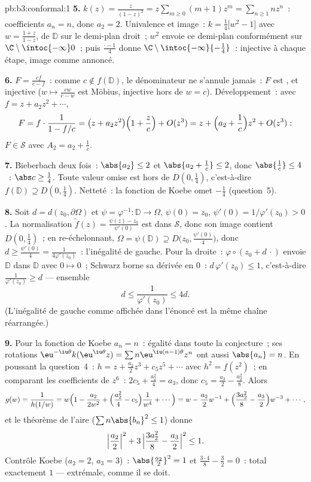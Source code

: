 \begin{solution}{pb:b3:conformal:1}
\textbf{5.} $k(z) = \frac z{(1-z)^2} = z\sum_{m\geq0}(m +
1)z^m = \sum_{n\geq1}nz^n$~: coefficients $a_n = n$, donc
$a_2 = 2$. Univalence et image~: $k = \frac14\bigl[w^2 -
1\bigr]$ avec $w = \frac{1 + z}{1 - z}$,  de $\mathbb D$ sur le demi-plan droit~; $w^2$
envoie ce demi-plan conformément sur
$\C\setminus\intoc{-\infty}0$~; puis $\frac{\cdot - 1}4$
donne $\C\setminus\intoc{-\infty}{-\frac14}$~: injective à
chaque étape, image comme annoncé.

\textbf{6.} $F = \frac{cf}{c - f}$~: comme $c \notin
f(\mathbb D)$, le dénominateur ne s'annule jamais~: $F$ est
, et injective ($w \mapsto \frac{cw}{c - w}$ est
Möbius, injective hors de $w = c$). Développement~: avec $f
= z + a_2z^2 + \cdots$,
\[
F = f\cdot\frac1{1 - f/c} = \bigl(z + a_2z^2\bigr)\Bigl(1 +
\frac zc\Bigr) + O(z^3)
= z + \Bigl(a_2 + \frac1c\Bigr)z^2 + O(z^3):
\]
$F \in \mathcal S$ avec $A_2 = a_2 + \frac1c$.

\textbf{7.} Bieberbach deux fois~: $\abs{a_2} \leq 2$ et
$\abs{a_2 + \frac1c} \leq 2$, donc $\abs{\frac1c} \leq 4$~:
$\abs c \geq \frac14$. Toute valeur omise est hors de
$D(0,\frac14)$, c'est-à-dire $f(\mathbb D) \supseteq D(0,
\frac14)$. Netteté~: la fonction de Koebe omet $-\frac14$
(question~5).

\textbf{8.} Soit $d = d(z_0, \partial\Omega)$ et $\psi =
\varphi^{-1} \colon \mathbb D \to \Omega$, $\psi(0) = z_0$,
$\psi'(0) = 1/\varphi'(z_0) > 0$. La normalisation $\tilde
f(z) = \frac{\psi(z) - z_0}{\psi'(0)}$ est dans $\mathcal
S$, donc son image contient $D(0, \frac14)$~; en
re-échelonnant, $\Omega = \psi(\mathbb D) \supseteq
D\bigl(z_0, \tfrac{\psi'(0)}4\bigr)$, donc $d \geq
\frac{\psi'(0)}4 = \frac1{4\varphi'(z_0)}$~: l'inégalité de
gauche. Pour la droite~: $\varphi\circ(z_0 + d\,\cdot)$
envoie $\mathbb D$ dans $\mathbb D$ avec $0 \mapsto 0$~;
Schwarz borne sa dérivée en $0$~: $d\,\varphi'(z_0) \leq 1$,
c'est-à-dire $\frac1{\varphi'(z_0)} \geq d$ --- ensemble
\[
d \leq \frac1{\varphi'(z_0)} \leq 4d .
\]
(L'inégalité de gauche comme affichée dans l'énoncé est la
même chaîne réarrangée.)

\textbf{9.} Pour la fonction de Koebe $a_n = n$~: égalité
dans toute la conjecture~; ses rotations
$\eu^{-\iu\theta}k(\eu^{\iu\theta}z) = \sum
n\eu^{\iu(n-1)\theta}z^n$ ont aussi $\abs{a_n} = n$. En
poussant la question~4~: $h = z + \frac{a_2}2z^3 + c_5z^5 +
\cdots$ avec $h^2 = f(z^2)$~; en comparant les coefficients
de $z^6$~: $2c_5 + \frac{a_2^2}4 = a_3$, donc $c_5 =
\frac{a_3}2 - \frac{a_2^2}8$. Alors
\[
g(w) = \frac1{h(1/w)} = w\Bigl(1 - \frac{a_2}{2w^2} +
\Bigl(\frac{a_2^2}4 - c_5\Bigr)\frac1{w^4} + \cdots\Bigr)
= w - \frac{a_2}2w^{-1} + \Bigl(\frac{3a_2^2}8 -
\frac{a_3}2\Bigr)w^{-3} + \cdots,
\]
et le théorème de l'aire ($\sum n\abs{b_n}^2 \leq 1$) donne
\[
\Bigl|\frac{a_2}2\Bigr|^2 + 3\,\Bigl|\frac{3a_2^2}8 -
\frac{a_3}2\Bigr|^2 \leq 1 .
\]
Contrôle Koebe ($a_2 = 2$, $a_3 = 3$)~: $\abs{\frac{a_2}2}^2
= 1$ et $\frac{3\cdot4}8 - \frac32 = 0$~: total exactement
$1$ --- extrémale, comme il se doit.


\end{solution}
